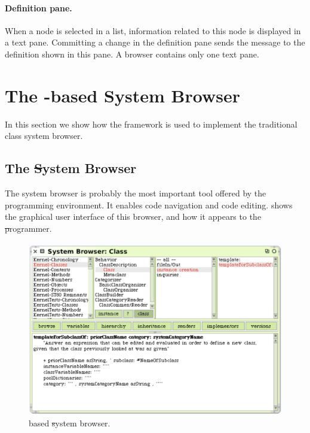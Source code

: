 \documentclass[a4paper,10pt,twoside]{book}
\begin{document}
\paragraph{Definition pane.} When a node is selected in a list, information related to this node is displayed in a text pane. Committing a change in the definition pane sends the message  to the definition shown in this pane. A browser contains only one text pane.




\section{The \ob-based System Browser} 

In this section we show how the framework is used to implement the traditional class system browser. 

\subsection{The \st System Browser}
The system browser is probably the most important tool offered by the \pharo programming environment. It enables code navigation and code editing.  shows the graphical user interface of this browser, and how it appears to the \st programmer. 


\begin{figure}[!ht]
\begin{center}
\includegraphics[scale=0.50]{obbrowser.pdf}
\caption{\ob based \st system browser.} 
\end{center}
\end{figure}
\end{document}
